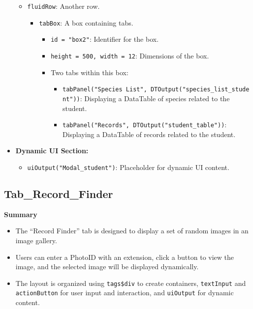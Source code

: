 \documentclass[
]{book}
\providecommand{\tightlist}{%
  \setlength{\itemsep}{0pt}\setlength{\parskip}{0pt}}
\begin{document}
\begin{itemize}
  \begin{itemize}
  \tightlist
  \item
    \texttt{fluidRow}: Another row.

    \begin{itemize}
    \tightlist
    \item
      \texttt{tabBox}: A box containing tabs.

      \begin{itemize}
      \tightlist
      \item
        \texttt{id\ =\ "box2"}: Identifier for the box.
      \item
        \texttt{height\ =\ 500,\ width\ =\ 12}: Dimensions of the box.
      \item
        Two tabs within this box:

        \begin{itemize}
        \tightlist
        \item
          \texttt{tabPanel("Species\ List",\ DTOutput("species\_list\_student"))}: Displaying a DataTable of species related to the student.
        \item
          \texttt{tabPanel("Records",\ DTOutput("student\_table"))}: Displaying a DataTable of records related to the student.
        \end{itemize}
      \end{itemize}
    \end{itemize}
  \end{itemize}
\item
  \textbf{Dynamic UI Section:}

  \begin{itemize}
  \tightlist
  \item
    \texttt{uiOutput("Modal\_student")}: Placeholder for dynamic UI content.
  \end{itemize}
\end{itemize}

\hypertarget{tab_record_finder}{%
\subsection{Tab\_Record\_Finder}\label{tab_record_finder}}

\textbf{Summary}

\begin{itemize}
\tightlist
\item
  The ``Record Finder'' tab is designed to display a set of random images in an image gallery.
\item
  Users can enter a PhotoID with an extension, click a button to view the image, and the selected image will be displayed dynamically.
\item
  The layout is organized using \texttt{tags\$div} to create containers, \texttt{textInput} and \texttt{actionButton} for user input and interaction, and \texttt{uiOutput} for dynamic content.
\end{itemize}
\end{document}
